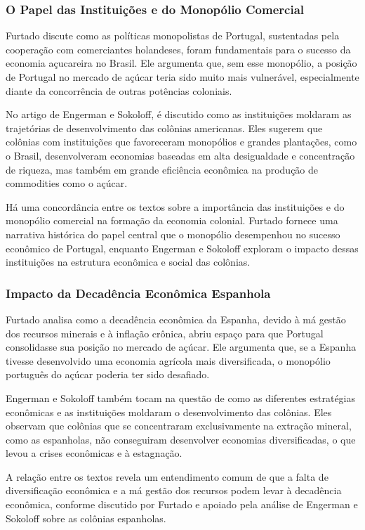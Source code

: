 \documentclass[a4paper,12pt]{article}[abntex2]
\begin{document}
\subsubsection*{O Papel das Instituições e do Monopólio Comercial}

Furtado discute como as políticas monopolistas de Portugal, sustentadas pela cooperação com comerciantes holandeses, foram fundamentais para o sucesso da economia açucareira no Brasil. Ele argumenta que, sem esse monopólio, a posição de Portugal no mercado de açúcar teria sido muito mais vulnerável, especialmente diante da concorrência de outras potências coloniais.

No artigo de Engerman e Sokoloff, é discutido como as instituições moldaram as trajetórias de desenvolvimento das colônias americanas. Eles sugerem que colônias com instituições que favoreceram monopólios e grandes plantações, como o Brasil, desenvolveram economias baseadas em alta desigualdade e concentração de riqueza, mas também em grande eficiência econômica na produção de commodities como o açúcar.

Há uma concordância entre os textos sobre a importância das instituições e do monopólio comercial na formação da economia colonial. Furtado fornece uma narrativa histórica do papel central que o monopólio desempenhou no sucesso econômico de Portugal, enquanto Engerman e Sokoloff exploram o impacto dessas instituições na estrutura econômica e social das colônias.

\subsubsection*{Impacto da Decadência Econômica Espanhola}

Furtado analisa como a decadência econômica da Espanha, devido à má gestão dos recursos minerais e à inflação crônica, abriu espaço para que Portugal consolidasse sua posição no mercado de açúcar. Ele argumenta que, se a Espanha tivesse desenvolvido uma economia agrícola mais diversificada, o monopólio português do açúcar poderia ter sido desafiado.

Engerman e Sokoloff também tocam na questão de como as diferentes estratégias econômicas e as instituições moldaram o desenvolvimento das colônias. Eles observam que colônias que se concentraram exclusivamente na extração mineral, como as espanholas, não conseguiram desenvolver economias diversificadas, o que levou a crises econômicas e à estagnação.

A relação entre os textos revela um entendimento comum de que a falta de diversificação econômica e a má gestão dos recursos podem levar à decadência econômica, conforme discutido por Furtado e apoiado pela análise de Engerman e Sokoloff sobre as colônias espanholas.
\end{document}
